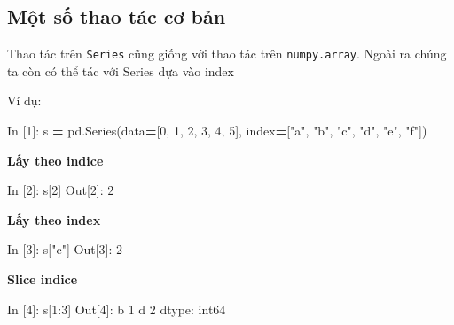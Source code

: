 \documentclass[
]{book}
\newenvironment{Shaded}{\begin{snugshade}}{\end{snugshade}}
\newcommand{\DecValTok}[1]{\textcolor[rgb]{0.00,0.00,0.81}{#1}}
\newcommand{\NormalTok}[1]{#1}
\newcommand{\OperatorTok}[1]{\textcolor[rgb]{0.81,0.36,0.00}{\textbf{#1}}}
\newcommand{\StringTok}[1]{\textcolor[rgb]{0.31,0.60,0.02}{#1}}
\begin{document}
\hypertarget{mux1ed9t-sux1ed1-thao-tuxe1c-cux1a1-bux1ea3n}{%
\subsection*{Một số thao tác cơ bản}\label{mux1ed9t-sux1ed1-thao-tuxe1c-cux1a1-bux1ea3n}}

Thao tác trên \texttt{Series} cũng giống với thao tác trên \texttt{numpy.array}. Ngoài ra chúng ta còn có thể
tác với Series dựa vào index

Ví dụ:

\begin{Shaded}
\begin{Highlighting}[]
\NormalTok{In [}\DecValTok{1}\NormalTok{]: s }\OperatorTok{=}\NormalTok{ pd.Series(data}\OperatorTok{=}\NormalTok{[}\DecValTok{0}\NormalTok{, }\DecValTok{1}\NormalTok{, }\DecValTok{2}\NormalTok{, }\DecValTok{3}\NormalTok{, }\DecValTok{4}\NormalTok{, }\DecValTok{5}\NormalTok{], index}\OperatorTok{=}\NormalTok{[}\StringTok{"a"}\NormalTok{, }\StringTok{"b"}\NormalTok{, }\StringTok{"c"}\NormalTok{, }\StringTok{"d"}\NormalTok{, }\StringTok{"e"}\NormalTok{, }\StringTok{"f"}\NormalTok{])}
\end{Highlighting}
\end{Shaded}

\textbf{Lấy theo indice}

\begin{Shaded}
\begin{Highlighting}[]
\NormalTok{In [}\DecValTok{2}\NormalTok{]: s[}\DecValTok{2}\NormalTok{]}
\NormalTok{Out[}\DecValTok{2}\NormalTok{]: }\DecValTok{2}
\end{Highlighting}
\end{Shaded}

\textbf{Lấy theo index}

\begin{Shaded}
\begin{Highlighting}[]
\NormalTok{In [}\DecValTok{3}\NormalTok{]: s[}\StringTok{"c"}\NormalTok{]}
\NormalTok{Out[}\DecValTok{3}\NormalTok{]: }\DecValTok{2} 
\end{Highlighting}
\end{Shaded}

\textbf{Slice indice}

\begin{Shaded}
\begin{Highlighting}[]
\NormalTok{In [}\DecValTok{4}\NormalTok{]: s[}\DecValTok{1}\NormalTok{:}\DecValTok{3}\NormalTok{]}
\NormalTok{Out[}\DecValTok{4}\NormalTok{]:}
\NormalTok{b    }\DecValTok{1}
\NormalTok{d    }\DecValTok{2}
\NormalTok{dtype: int64}
\end{Highlighting}
\end{Shaded}
\end{document}
